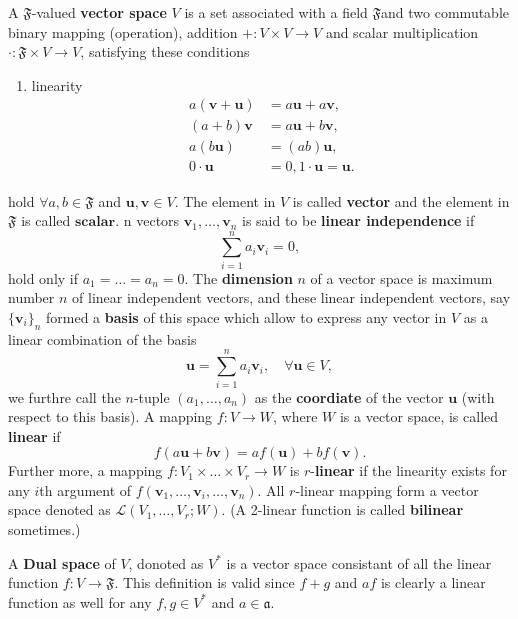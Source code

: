 \begin{definition}
A $\mathfrak{F}$-valued \textbf{vector space} $V$ is a set associated with a field $\mathfrak{F}$and two commutable binary mapping (operation), addition $+:V\times V\to V$ and scalar multiplication $\cdot:\mathfrak{F}\times V\to V$, satisfying these conditions
\begin{enumerate}
\item linearity
\begin{equation}
\begin{aligned}
a(\boldsymbol{v}+\boldsymbol{u}) &=a\boldsymbol{u}+a\boldsymbol{v},\\
(a+b)\boldsymbol{v} &= a\boldsymbol{u}+b\boldsymbol{v},\\
a(b\boldsymbol{u}) &= (ab)\boldsymbol{u},\\
0\cdot \boldsymbol{u} &= 0, 1\cdot\boldsymbol{u}=\boldsymbol{u}.
\end{aligned}
\end{equation}
\end{enumerate}
hold $\forall a,b \in \mathfrak{F}$ and $\boldsymbol{u},\boldsymbol{v}\in V$. The element in $V$ is called \textbf{vector} and the element in $\mathfrak{F}$ is called $\textbf{scalar}$. n vectors $\boldsymbol{v}_1,\dots,\boldsymbol{v}_n$ is said to be \textbf{linear independence} if
\begin{equation}
\sum_{i=1}^na_i\boldsymbol{v}_i=0,
\end{equation}
hold only if $a_1=\dots=a_n=0$. The \textbf{dimension} $n$ of a vector space is maximum number $n$ of linear independent vectors, and these linear independent vectors, say $\{\boldsymbol{v}_i\}_n$ formed a \textbf{basis} of this space which allow to express any vector in $V$ as a linear combination of the basis
\begin{equation}
\boldsymbol{u} = \sum_{i=1}^na_i\boldsymbol{v}_i,\quad \forall \boldsymbol{u}\in V,
\end{equation}
we furthre call the $n$-tuple $(a_1,\dots,a_n)$ as the \textbf{coordiate} of the vector $\boldsymbol{u}$ (with respect to this basis).
A mapping $f:V\to W$, where $W$ is a vector space, is called \textbf{linear} if
\begin{equation}
f(a\boldsymbol{u}+b\boldsymbol{v})=af(\boldsymbol{u})+bf(\boldsymbol{v}).
\end{equation}
Further more, a mapping $f:V_1\times\dots\times V_r\to W$ is $r$-\textbf{linear} if the linearity exists for any $i$th argument of $f(\boldsymbol{v}_1,\dots,\boldsymbol{v}_i,\dots,\boldsymbol{v}_n)$. All $r$-linear mapping form a vector space denoted as $\mathcal{L}(V_1,\dots,V_r; W)$. (A 2-linear function is called \textbf{bilinear} sometimes.)

A \textbf{Dual space} of $V$, donoted as $V^*$ is a vector space consistant of all the linear function $f:V\to\mathfrak{F}$. This definition is valid since $f+g$ and $af$ is clearly a linear function as well for any $f,g\in V^*$ and $a\in\mathfrak{a}$.  
\end{definition}

